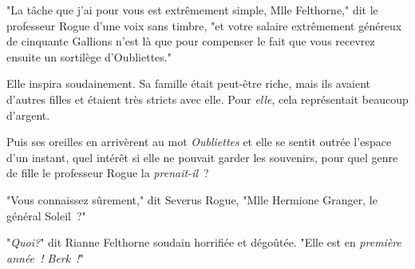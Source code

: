 "La tâche que j'ai pour vous est extrêmement simple, Mlle Felthorne," dit le professeur Rogue d'une voix sans timbre, "et votre salaire extrêmement généreux de cinquante Gallions n'est là que pour compenser le fait que vous recevrez ensuite un sortilège d'Oubliettes."

Elle inspira soudainement. Sa famille était peut-être riche, mais ils avaient d'autres filles et étaient très stricts avec elle. Pour \emph{elle}, cela représentait beaucoup d'argent.

Puis ses oreilles en arrivèrent au mot \emph{Oubliettes} et elle se sentit outrée l'espace d'un instant, quel intérêt si elle ne pouvait garder les souvenirs, pour quel genre de fille le professeur Rogue la \emph{prenait-il}~?

"Vous connaissez sûrement," dit Severus Rogue, "Mlle Hermione Granger, le général Soleil~?"

"\emph{Quoi?}" dit Rianne Felthorne soudain horrifiée et dégoûtée. "Elle est en \emph{première année~! Berk~!}" 


